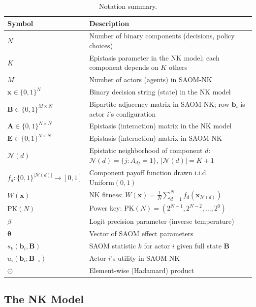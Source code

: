 \documentclass[12pt]{article}
\newcommand{\bx}{\mathbf{x}}
\newcommand{\bb}{\mathbf{b}}
\newcommand{\bB}{\mathbf{B}}
\newcommand{\bA}{\mathbf{A}}
\newcommand{\bE}{\mathbf{E}}
\newcommand{\btheta}{\boldsymbol{\theta}}
\begin{document}
\begin{table}[h!]
\centering
\caption{Notation summary.}
\label{tab:notation}
\small
\begin{tabular}{@{}lp{10.5cm}@{}}
\toprule
\textbf{Symbol} & \textbf{Description} \\
\midrule
$N$           & Number of binary components (decisions, policy choices) \\
$K$           & Epistasis parameter in the NK model; each component depends on $K$ others \\
$M$           & Number of actors (agents) in SAOM-NK \\
$\bx \in \{0,1\}^N$ & Binary decision string (state) in the NK model \\
$\bB \in \{0,1\}^{M \times N}$ & Bipartite adjacency matrix in SAOM-NK; row $\bb_i$ is actor $i$'s configuration \\
$\bA \in \{0,1\}^{N \times N}$ & Epistasis (interaction) matrix in the NK model \\
$\bE \in \{0,1\}^{N \times N}$ & Epistasis (interaction) matrix in SAOM-NK \\
$\mathcal{N}(d)$ & Epistatic neighborhood of component $d$: $\mathcal{N}(d) = \{j : A_{dj} = 1\}$, $|\mathcal{N}(d)| = K+1$ \\
$f_d : \{0,1\}^{|\mathcal{N}(d)|} \to [0,1]$ & Component payoff function drawn i.i.d.\ $\mathrm{Uniform}(0,1)$ \\
$W(\bx)$      & NK fitness: $W(\bx) = \frac{1}{N}\sum_{d=1}^{N} f_d(\bx_{\mathcal{N}(d)})$ \\
$\mathrm{PK}(N)$ & Power key: $\mathrm{PK}(N) = (2^{N-1}, 2^{N-2}, \ldots, 2^0)$ \\
$\beta$       & Logit precision parameter (inverse temperature) \\
$\btheta$     & Vector of SAOM effect parameters \\
$s_k(\bb_i, \bB)$ & SAOM statistic $k$ for actor $i$ given full state $\bB$ \\
$u_i(\bb_i; \bB_{-i})$ & Actor $i$'s utility in SAOM-NK \\
$\odot$       & Element-wise (Hadamard) product \\
\bottomrule
\end{tabular}
\end{table}

\subsection{The NK Model}
\label{sec:nk_model}
\end{document}
